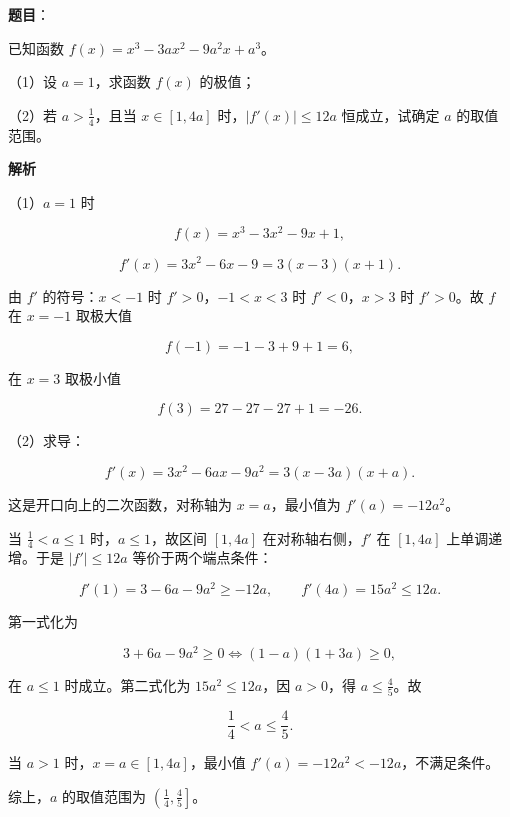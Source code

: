 \begin{answer}

\textbf{题目}：

已知函数 $f(x)=x^3-3ax^2-9a^2x+a^3$。

（1）设 $a=1$，求函数 $f(x)$ 的极值；

（2）若 $a>\frac14$，且当 $x\in[1,4a]$ 时，$|f'(x)|\leqslant12a$ 恒成立，试确定 $a$ 的取值范围。

\textbf{解析}

（1）$a=1$ 时

\nopagebreak[4]
\[f(x)=x^3-3x^2-9x+1,\]

\nopagebreak[4]
\[f'(x)=3x^2-6x-9=3(x-3)(x+1).\]

由 $f'$ 的符号：$x<-1$ 时 $f'>0$，$-1<x<3$ 时 $f'<0$，$x>3$ 时 $f'>0$。故 $f$ 在 $x=-1$ 取极大值

\nopagebreak[4]
\[f(-1)=-1-3+9+1=6,\]

在 $x=3$ 取极小值

\nopagebreak[4]
\[f(3)=27-27-27+1=-26 .\]

（2）求导：

\nopagebreak[4]
\[f'(x)=3x^2-6ax-9a^2=3(x-3a)(x+a).\]

这是开口向上的二次函数，对称轴为 $x=a$，最小值为 $f'(a)=-12a^2$。

当 $\frac14<a\leqslant1$ 时，$a\leqslant1$，故区间 $[1,4a]$ 在对称轴右侧，$f'$ 在 $[1,4a]$ 上单调递增。于是 $|f'|\leqslant12a$ 等价于两个端点条件：

\nopagebreak[4]
\[f'(1)=3-6a-9a^2\geqslant-12a,\qquad f'(4a)=15a^2\leqslant12a .\]

第一式化为

\nopagebreak[4]
\[3+6a-9a^2\geqslant0\iff(1-a)(1+3a)\geqslant0,\]

在 $a\leqslant1$ 时成立。第二式化为 $15a^2\leqslant12a$，因 $a>0$，得 $a\leqslant\frac45$。故

\nopagebreak[4]
\[\frac14<a\leqslant\frac45 .\]

当 $a>1$ 时，$x=a\in[1,4a]$，最小值 $f'(a)=-12a^2<-12a$，不满足条件。

综上，$a$ 的取值范围为 $\left(\frac14,\frac45\right]$。


\end{answer}

